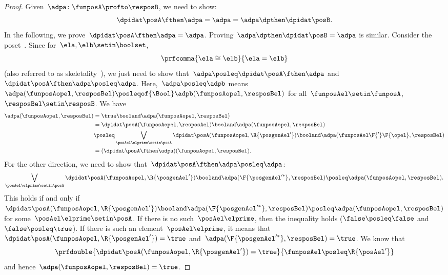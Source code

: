 \begin{proof}
    Given~$\adpa\colon \funposA\profto \resposB$, we need to show:
    \begin{equation}
        \dpidat\posA \fthen \adpa = \adpa = \adpa \dpthen \dpidat\posB.
    \end{equation}
    In the following, we prove~$\dpidat\posA \fthen \adpa = \adpa$.
    Proving~$\adpa\dpthen \dpidat\posB=\adpa$ is similar.
    Consider the poset~\Bool.
    Since for~$\ela,\elb\setin \boolset$,
    \begin{equation}
        \prfcomma{
            \ela\cong \elb
        }{
            \ela=\elb
        }
    \end{equation}
    (also referred to as skeletality~\cite{fong2019}), we just need to show that~$\adpa\posleq \dpidat\posA\fthen \adpa$ and~$\dpidat\posA\fthen \adpa\posleq \adpa$.
    Here,~$\adpa\posleq \adpb$ means~$\adpa(\funposAopel,\resposBel)\posleqof{\Bool}\adpb(\funposAopel,\resposBel)$ for all~$\funposAel\setin \funposA$,~$\resposBel\setin \resposB$.
    We have
    \begin{equation}
        \label{eq:dp_unit_1}
        \begin{aligned}
            \adpa(\funposAopel,\resposBel) & =\true \booland \adpa(\funposAopel,\resposBel) \\
                                           & = \dpidat\posA(\funposAopel,\resposAel) \booland \adpa(\funposAopel,\resposBel) \\
                                           & \posleq \bigvee_{\posAel\elprime \setin \posA}\dpidat\posA(\funposAopel,\R{\posgenAel'})\booland \adpa(\funposAel\F{'}\F{\opel},\resposBel) \\
                                           & =(\dpidat\posA\fthen \adpa)(\funposAopel,\resposBel).
        \end{aligned}
    \end{equation}
    For the other direction, we need to show that~$\dpidat\posA\fthen \adpa\posleq \adpa$:
    \begin{equation}
        \label{eq:dp_unit_2}
        \bigvee_{\posAel\elprime\setin \posA}\dpidat\posA(\funposAopel,\R{\posgenAel'})\booland \adpa(\F{\posgenAel'^*},\resposBel) \posleq \adpa(\funposAopel,\resposBel).
    \end{equation}
    This holds if and only if~$\dpidat\posA(\funposAopel,\R{\posgenAel'})\booland \adpa(\F{\posgenAel'^*},\resposBel) \posleq \adpa(\funposAopel,\resposBel)$ for some~$\posAel\elprime\setin \posA$.
    If there is no such~$\posAel\elprime$, then the inequality holds ($\false \posleq \false$ and~$\false \posleq \true$).
    If there is such an element~$\posAel\elprime$, it means that~$\dpidat\posA(\funposAopel,\R{\posgenAel'})=\true$ and~$\adpa(\F{\posgenAel'^*},\resposBel)=\true$.
    We know that
    \begin{equation}
        \prfdouble{
            \dpidat\posA(\funposAopel,\R{\posgenAel'})=\true
        }{
            \funposAel \posleq \R{\posAel'}
        }
    \end{equation}
    and hence~$\adpa(\funposAopel,\resposBel)=\true$.
\end{proof}
